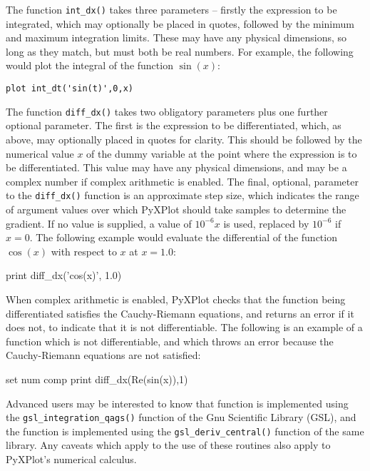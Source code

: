 The function {\tt int\_dx()} takes three parameters -- firstly the expression
to be integrated, which may optionally be placed in quotes, followed by the
minimum and maximum integration limits. These may have any physical dimensions,
so long as they match, but must both be real numbers. For example, the
following would plot the integral of the function $\sin(x)$:

\begin{verbatim}
plot int_dt('sin(t)',0,x)
\end{verbatim}

The function {\tt diff\_dx()} takes two obligatory parameters plus one further
optional parameter. The first is the expression to be differentiated, which,
as above, may optionally placed in quotes for clarity. This should be followed
by the numerical value $x$ of the dummy variable at the point where the
expression is to be differentiated. This value may have any physical
dimensions, and may be a complex number if complex arithmetic is enabled. The
final, optional, parameter to the {\tt diff\_dx()} function is an approximate
step size, which indicates the range of argument values over which PyXPlot
should take samples to determine the gradient. If no value is supplied, a value
of $10^{-6}x$ is used, replaced by $10^{-6}$ if $x=0$.  The following example
would evaluate the differential of the function $\cos(x)$ with respect to $x$
at $x=1.0$:

\begin{dodo}
print diff\_dx('cos(x)', 1.0)
\end{dodo}

When complex arithmetic is enabled, PyXPlot checks that the function being
differentiated satisfies the Cauchy-Riemann equations, and returns an error if
it does not, to indicate that it is not differentiable.  The following is an
example of a function which is not differentiable, and which throws an error
because the Cauchy-Riemann equations are not satisfied:

\begin{dontdo}
set num comp\newline
print diff\_dx(Re(sin(x)),1)
\end{dontdo}

Advanced users may be interested to know that  function is
implemented using the {\tt gsl\_\-integration\_\-qags()} function of the Gnu
Scientific Library (GSL), and the  function is
implemented using the {\tt gsl\_\-deriv\_\-central()} function of the same library.
Any caveats which apply to the use of these routines also apply to PyXPlot's
numerical calculus.

